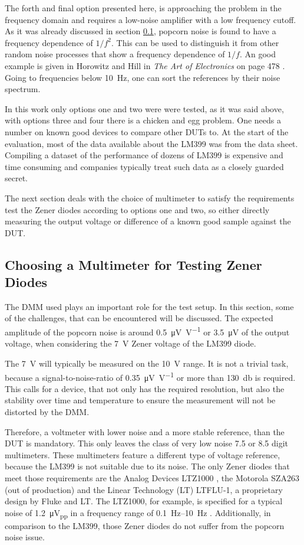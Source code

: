 The forth and final option presented here, is approaching the problem in the frequency domain and requires a low-noise amplifier with a low frequency cutoff. As it was already discussed in section \ref{}, popcorn noise is found to have a frequency dependence of $1/f^2$. This can be used to distinguish it from other random noise processes that show a frequency dependence of $1/f$. An good example is given in Horowitz and Hill in \textit{The Art of Electronics} on page 478 \cite{horowitz1989}. Going to frequencies below \qty{10}{\Hz}, one can sort the references by their noise spectrum.

In this work only options one and two were were tested, as it was said above, with options three and four there is a chicken and egg problem. One needs a number on known good devices to compare other DUTs to. At the start of the evaluation, most of the data available about the LM399 was from the data sheet. Compiling a dataset of the performance of dozens of LM399 is expensive and time consuming and companies typically treat such data as a closely guarded secret.

The next section deals with the choice of multimeter to satisfy the requirements test the Zener diodes according to options one and two, so either directly measuring the output voltage or difference of a known good sample against the DUT.

\subsection{Choosing a Multimeter for Testing Zener Diodes}
The DMM used plays an important role for the test setup. In this section, some of the challenges, that can be encountered will be discussed. The expected amplitude of the popcorn noise is around \qty[per-mode=symbol]{0.5}{\micro\volt \per \volt} or \qty{3.5}{\micro\volt} of the output voltage, when considering the \qty{7}{\volt} Zener voltage of the LM399 diode.

The \qty{7}{\volt} will typically be measured on the \qty{10}{\volt} range. It is not a trivial task, because a signal-to-noise-ratio of \qty[per-mode=symbol]{0.35}{\micro\volt \per \volt} or more than \qty{130}{\decibel} is required. This calls for a device, that not only has the required resolution, but also the stability over time and temperature to ensure the measurement will not be distorted by the DMM.

Therefore, a voltmeter with lower noise and a more stable reference, than the DUT is mandatory. This only leaves the class of very low noise \num{7.5} or \num{8.5} digit multimeters. These multimeters feature a different type of voltage reference, because the LM399 is not suitable due to its noise. The only Zener diodes that meet those requirements are the Analog Devices LTZ1000 \cite{datasheet_LTZ1000}, the Motorola SZA263 (out of production) and the Linear Technology (LT) LTFLU-1, a proprietary design by Fluke and LT. The LTZ1000, for example, is specified for a typical noise of \qty{1.2}{\micro\volt_{pp}} in a frequency range of \qtyrange{0.1}{10}{\Hz} \cite{datasheet_LTZ1000}. Additionally, in comparison to the LM399, those Zener diodes do not suffer from the popcorn noise issue.


